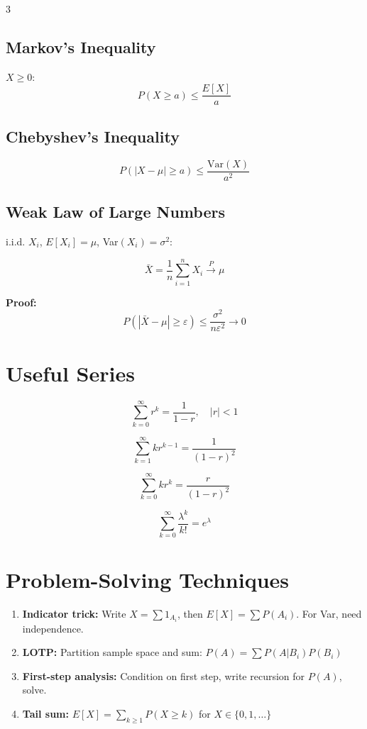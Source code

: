 \documentclass[10pt,landscape]{article}
\begin{document}
\begin{multicols}{3}
\subsection{Markov's Inequality}
$X \geq 0$:
$$P(X \geq a) \leq \frac{E[X]}{a}$$

\subsection{Chebyshev's Inequality}
$$P(|X - \mu| \geq a) \leq \frac{\text{Var}(X)}{a^2}$$

\subsection{Weak Law of Large Numbers}
i.i.d. $X_i$, $E[X_i] = \mu$, Var$(X_i) = \sigma^2$:

$$\bar{X} = \frac{1}{n} \sum_{i=1}^n X_i \xrightarrow{P} \mu$$

\textbf{Proof:}
$$P(|\bar{X} - \mu| \geq \varepsilon) \leq \frac{\sigma^2}{n\varepsilon^2} \to 0$$

\section{Useful Series}

$$\sum_{k=0}^\infty r^k = \frac{1}{1 - r}, \quad |r| < 1$$

$$\sum_{k=1}^\infty kr^{k-1} = \frac{1}{(1 - r)^2}$$

$$\sum_{k=0}^\infty kr^k = \frac{r}{(1 - r)^2}$$

$$\sum_{k=0}^\infty \frac{\lambda^k}{k!} = e^\lambda$$

\section{Problem-Solving Techniques}

\begin{enumerate}[leftmargin=*,noitemsep]
\item \textbf{Indicator trick:} Write $X = \sum 1_{A_i}$, then $E[X] = \sum P(A_i)$. For Var, need independence.

\item \textbf{LOTP:} Partition sample space and sum: $P(A) = \sum P(A | B_i) P(B_i)$

\item \textbf{First-step analysis:} Condition on first step, write recursion for $P(A)$, solve.

\item \textbf{Tail sum:} $E[X] = \sum_{k \geq 1} P(X \geq k)$ for $X \in \{0, 1, \ldots\}$


\end{enumerate}
\end{multicols}
\end{document}
